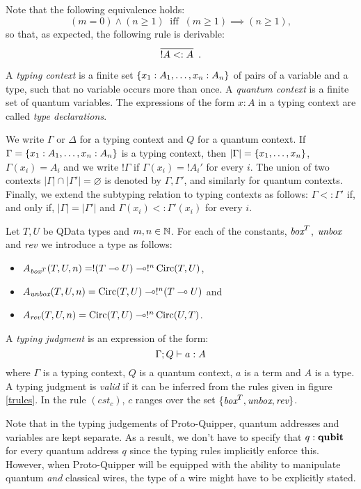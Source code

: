 \documentclass[twoside]{article}
\begin{document}
Note that the following equivalence holds: 
\[
(m=0)\wedge (n\geq 1) 
~\mbox{ iff }~ 
(m\geq 1) \implies (n\geq 1),
\]
so that, as expected, the following rule is derivable:
\[
  \infer[]{!A <: A}{}
  .
\]

\begin{definition}
A \emph{typing context} is a finite set 
$\{x_1:A_1,\ldots,x_n:A_n\}$ of pairs of a variable and 
a type, such that no variable occurs more than once. A 
\emph{quantum context} is a finite set of quantum variables. 
The expressions of the form $x:A$ in a typing context are 
called \emph{type declarations}.	
\end{definition}

We write $\Gamma$ or $\Delta$ for a typing context and $Q$ for 
a quantum context. If $\Gamma =\{x_1:A_1,\ldots,x_n:A_n\}$ is 
a typing context, then $|\Gamma|=\{x_1,\ldots,x_n\}$, 
$\Gamma (x_i)=A_i$ and we write $!\Gamma$ if $\Gamma(x_i)=!A_i'$ 
for every $i$. The union of two contexts 
$|\Gamma|\cap  |\Gamma'|=\varnothing$ is denoted by $\Gamma,\Gamma'$, 
and similarly for quantum contexts. Finally, we extend the subtyping 
relation to typing contexts as follows: $\Gamma <: \Gamma'$ if, and 
only if, $|\Gamma | = |\Gamma'|$ and $\Gamma (x_i)<: \Gamma' (x_i)$ 
for every $i$.

\begin{definition}
Let $T,U$ be QData types and $m,n\in\mathbb{N}$. For each of the constants, 
$\mathop{\textit{box}}\nolimits^T$, $\mathop{\textit{unbox}}\nolimits$ and $\mathop{\textit{rev}}\nolimits$ we introduce a type as follows:
\begin{itemize}
  \item $A_{\mathop{\textit{box}}\nolimits^T}(T,U,n)=!(T\multimap U)\multimap !^n\mathop{\textrm{Circ}}\nolimits(T,U)$,
  \item $A_{\mathop{\textit{unbox}}\nolimits}(T,U,n)=\mathop{\textrm{Circ}}\nolimits(T,U)\multimap !^n(T\multimap U)$ and
  \item $A_{\mathop{\textit{rev}}\nolimits}(T,U,n)=\mathop{\textrm{Circ}}\nolimits(T,U) \multimap !^n\mathop{\textrm{Circ}}\nolimits(U,T)$.
\end{itemize}
\end{definition}

\begin{definition}
A \emph{typing judgment} is an expression of the form:
\[
\Gamma ; Q \vdash a:A
\] 
where $\Gamma$ is a typing context, $Q$ is a quantum context, 
$a$ is a term and $A$ is a type. A typing judgment is \emph{valid} if 
it can be inferred from the rules given in figure 
\hyperref[trules]{\ref*{trules}}. In the rule $(cst_c)$, 
$c$ ranges over the set $\{\mathop{\textit{box}}\nolimits^T, \mathop{\textit{unbox}}\nolimits, \mathop{\textit{rev}}\nolimits\}$.
\end{definition}

Note that in the typing judgements of Proto-Quipper, quantum addresses 
and variables are kept separate. As a result, we don't have to specify 
that $q:\textrm{\bf qubit}$ for every quantum address $q$ since the typing rules 
implicitly enforce this. However, when Proto-Quipper will be equipped 
with the ability to manipulate quantum \emph{and} classical wires, the 
type of a wire might have to be explicitly stated.
\end{document}
